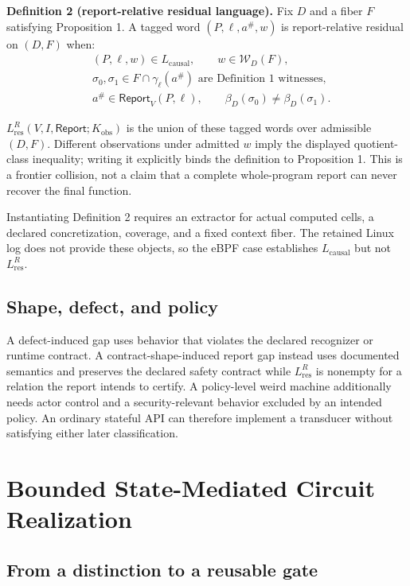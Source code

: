\documentclass[conference]{IEEEtran}
\begin{document}
\medskip
\noindent\textbf{Definition 2 (report-relative residual language).}
Fix $D$ and a fiber $F$ satisfying Proposition 1. A tagged word $(P,\ell,a^\#,w)$ is report-relative residual on $(D,F)$ when:
\begin{equation}
\begin{aligned}
&(P,\ell,w)\in L_{\mathrm{causal}},\qquad
w\in\mathcal W_D(F),\\
&\sigma_0,\sigma_1\in F\cap\gamma_\ell(a^\#)
\text{ are Definition 1 witnesses},\\
&a^\#\in\mathsf{Report}_V(P,\ell),\qquad
\beta_D(\sigma_0)\ne\beta_D(\sigma_1).
\end{aligned}
\end{equation}

$L_{\mathrm{res}}^R(V,I,\mathsf{Report};K_{\mathrm{obs}})$ is the union of these tagged words over admissible $(D,F)$. Different observations under admitted $w$ imply the displayed quotient-class inequality; writing it explicitly binds the definition to Proposition 1. This is a frontier collision, not a claim that a complete whole-program report can never recover the final function.

Instantiating Definition 2 requires an extractor for actual computed cells, a declared concretization, coverage, and a fixed context fiber. The retained Linux log does not provide these objects, so the eBPF case establishes $L_{\mathrm{causal}}$ but not $L_{\mathrm{res}}^R$.

\subsection{Shape, defect, and policy}

A defect-induced gap uses behavior that violates the declared recognizer or runtime contract. A contract-shape-induced report gap instead uses documented semantics and preserves the declared safety contract while $L_{\mathrm{res}}^R$ is nonempty for a relation the report intends to certify. A policy-level weird machine additionally needs actor control and a security-relevant behavior excluded by an intended policy. An ordinary stateful API can therefore implement a transducer without satisfying either later classification.

\section{Bounded State-Mediated Circuit Realization}

\subsection{From a distinction to a reusable gate}
\end{document}
